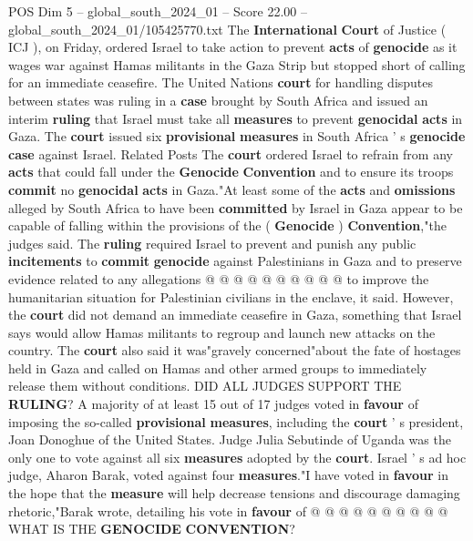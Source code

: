 \begin{textsample}{POS Dim 5 – global\_south\_2024\_01 – Score 22.00 – global\_south\_2024\_01/105425770.txt}  \label{ex:f5_pos_003}
The \textbf{International} \textbf{Court} of Justice ( ICJ ), on Friday, ordered Israel to take action to prevent \textbf{acts} of \textbf{genocide} as it wages war against Hamas militants in the Gaza Strip but stopped short of calling for an immediate ceasefire.
The United Nations \textbf{court} for handling disputes between states was ruling in a \textbf{case} brought by South Africa and issued an interim \textbf{ruling} that Israel must take all \textbf{measures} to prevent \textbf{genocidal} \textbf{acts} in Gaza.
The \textbf{court} issued six \textbf{provisional} \textbf{measures} in South Africa ' s \textbf{genocide} \textbf{case} against Israel.
Related Posts The \textbf{court} ordered Israel to refrain from any \textbf{acts} that could fall under the \textbf{Genocide} \textbf{Convention} and to ensure its troops \textbf{commit} no \textbf{genocidal} \textbf{acts} in Gaza."At least some of the \textbf{acts} and \textbf{omissions} alleged by South Africa to have been \textbf{committed} by Israel in Gaza appear to be capable of falling within the provisions of the ( \textbf{Genocide} ) \textbf{Convention},"the judges said.
The \textbf{ruling} required Israel to prevent and punish any public \textbf{incitements} to \textbf{commit} \textbf{genocide} against Palestinians in Gaza and to preserve evidence related to any allegations @ @ @ @ @ @ @ @ @ @ to improve the humanitarian situation for Palestinian civilians in the enclave, it said.
However, the \textbf{court} did not demand an immediate ceasefire in Gaza, something that Israel says would allow Hamas militants to regroup and launch new attacks on the country.
The \textbf{court} also said it was"gravely concerned"about the fate of hostages held in Gaza and called on Hamas and other armed groups to immediately release them without conditions.
DID ALL JUDGES SUPPORT THE \textbf{RULING}?
A majority of at least 15 out of 17 judges voted in \textbf{favour} of imposing the so-called \textbf{provisional} \textbf{measures}, including the \textbf{court} ' s president, Joan Donoghue of the United States.
Judge Julia Sebutinde of Uganda was the only one to vote against all six \textbf{measures} adopted by the \textbf{court}.
Israel ' s ad hoc judge, Aharon Barak, voted against four \textbf{measures}."I have voted in \textbf{favour} in the hope that the \textbf{measure} will help decrease tensions and discourage damaging rhetoric,"Barak wrote, detailing his vote in \textbf{favour} of @ @ @ @ @ @ @ @ @ @ WHAT IS THE \textbf{GENOCIDE} \textbf{CONVENTION}?

\end{textsample}
